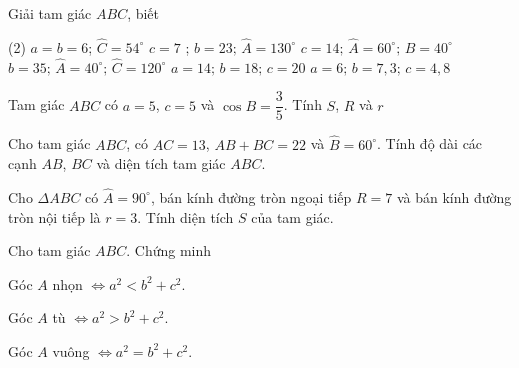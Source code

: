 \begin{baitap}
	Giải tam giác $ABC$, biết
	\begin{tasks}(2)
		\task $a=b=6$; $\widehat{C}=54^{\circ}$
		\task $c=7$ ; $b=23\text{; }\widehat{A}=130^{\circ}$ 
		\task $c=14\text{; }\widehat{A}=60^{\circ}\text{; }\widehat{B}=40^{\circ}$
		\task $b=35\text{; }\widehat{A}=40^{\circ}\text{; }\widehat{C}=120^{\circ}$ 
		\task $a=14\text{; }b=18\text{; }c=20$ 
		\task $a=6\text{; }b=7,3\text{; }c=4,8$
	\end{tasks}
\end{baitap}

\begin{baitap}
	Tam giác $ABC$ có $a= 5$, $c= 5$ và $\cos B=\dfrac{3}{5}$. Tính $S$, $R$ và $r$
\end{baitap}

\begin{baitap}
	Cho tam giác $ABC$, có $AC= 13$, $AB+BC= 22$ và $\widehat{B}=60^{\circ}$. Tính độ dài các cạnh $AB$, $BC$ và diện tích tam giác $ABC$.
\end{baitap}

\begin{baitap}
	Cho $\Delta ABC$ có $\widehat{A}=90^\circ$, bán kính đường tròn ngoại tiếp $R=7$ và bán kính đường tròn nội tiếp là $r=3$. Tính diện tích $S$ của tam giác.
\end{baitap}

\begin{baitap}%
	Cho tam giác $ABC$. Chứng minh
	\begin{enumEX}{1}
		\item Góc $A$ nhọn $ \Leftrightarrow a^2<b^2+c^2$.
		\item Góc $A$ tù $ \Leftrightarrow a^2>b^2+c^2$.
		\item Góc $A$ vuông $ \Leftrightarrow a^2=b^2+c^2$.
	\end{enumEX}
\end{baitap}

